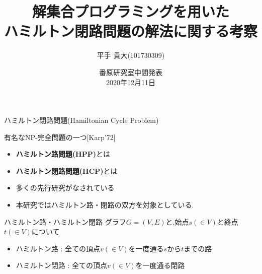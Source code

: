 \documentclass[dvipdfmx,11pt]{beamer}
\title{解集合プログラミングを用いた\\ハミルトン閉路問題の解法に関する考察}
\author{平手 貴大(101730309)}
\institute{名古屋大学情報学部コンピュータ科学科情報システム系}
\date{番原研究室中間発表\\2020年12月11日}
\begin{document}
\frame{\maketitle}
\begin{frame}{ハミルトン閉路問題(Hamiltonian Cycle Problem)}
  \begin{alertblock}{}
    \centering
    有名なNP-完全問題の一つ[Karp'72]
  \end{alertblock}

  \begin{itemize}
    \item \alert{\bf ハミルトン路問題(HPP)}とは
    \item \alert{\bf ハミルトン閉路問題(HCP)}とは
    \item 多くの先行研究がなされている
    \item 本研究ではハミルトン路・閉路の双方を対象としている.
  \end{itemize}
  \begin{block}{ハミルトン路・ハミルトン閉路}
    グラフ$G=(V,E)$と,始点$s(\in V)$と終点$t(\in V)$について
    \begin{itemize}
      \item \small{\alert{ハミルトン路} : 全ての頂点$v(\in V)$を一度通る$s$から$t$までの路}
      \item \small{\alert{ハミルトン閉路} : 全ての頂点$v(\in V)$を一度通る閉路}
    \end{itemize}
  \end{block}
\end{frame}
\end{document}
